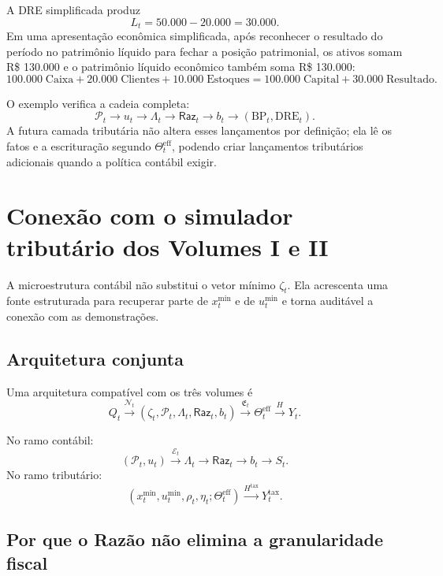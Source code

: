 \documentclass[11pt,a4paper]{article}
\newcommand{\BP}{\mathrm{BP}}
\newcommand{\DRE}{\mathrm{DRE}}
\newcommand{\cN}{\mathcal{N}}
\newcommand{\Plano}{\mathcal{P}}
\newcommand{\cE}{\mathcal{E}}
\newcommand{\Raz}{\mathsf{Raz}}
\begin{document}
A DRE simplificada produz
\[
L_t=50.000-20.000=30.000.
\]
Em uma apresentação econômica simplificada, após reconhecer o resultado do período no patrimônio líquido para fechar a posição patrimonial, os ativos somam R\$ 130.000 e o patrimônio líquido econômico também soma R\$ 130.000:
\[
100.000\;\text{Caixa}+20.000\;\text{Clientes}+10.000\;\text{Estoques}
=
100.000\;\text{Capital}+30.000\;\text{Resultado}.
\]

\begin{formalizacao}
O exemplo verifica a cadeia completa:
\[
\boxed{
\Plano_t
\to
u_t
\to
\Lambda_t
\to
\Raz_t
\to
b_t
\to
(\BP_t,\DRE_t).
}
\]
A futura camada tributária não altera esses lançamentos por definição; ela lê os fatos e a escrituração segundo $\Theta_t^{\mathrm{eff}}$, podendo criar lançamentos tributários adicionais quando a política contábil exigir.
\end{formalizacao}

\section{Conexão com o simulador tributário dos Volumes I e II}

A microestrutura contábil não substitui o vetor mínimo $\zeta_t$. Ela acrescenta uma fonte estruturada para recuperar parte de $x_t^{\min}$ e de $u_t^{\min}$ e torna auditável a conexão com as demonstrações.

\subsection{Arquitetura conjunta}

Uma arquitetura compatível com os três volumes é
\begin{equation}
\boxed{
Q_t
\xrightarrow{\cN_t}
(\zeta_t,\Plano_t,\Lambda_t,\Raz_t,b_t)
\xrightarrow{\mathfrak E_t}
\Theta_t^{\mathrm{eff}}
\xrightarrow{H}
Y_t.
}
\label{eq:all-volumes}
\end{equation}

No ramo contábil:
\[
(\Plano_t,u_t)\xrightarrow{\cE_t}\Lambda_t\to\Raz_t\to b_t\to S_t.
\]
No ramo tributário:
\[
(x_t^{\min},u_t^{\min},\rho_t,\eta_t;\Theta_t^{\mathrm{eff}})\xrightarrow{H^{\mathrm{tax}}}Y_t^{\mathrm{tax}}.
\]

\subsection{Por que o Razão não elimina a granularidade fiscal}
\end{document}
